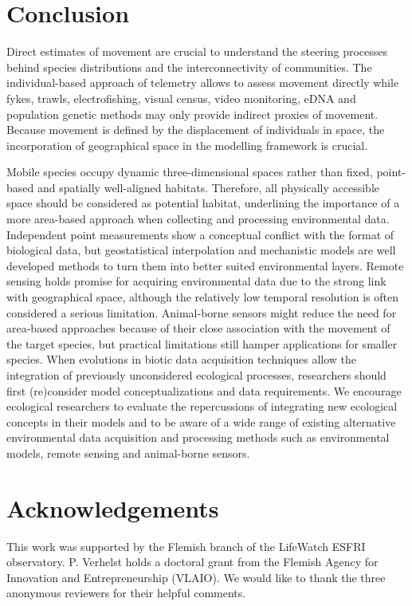 \documentclass[12pt,authoryear]{elsarticle}
\newcommand{\ackname}{Acknowledgements}
\begin{document}
\section{Conclusion}
Direct estimates of movement are crucial to understand the steering processes behind species distributions and the interconnectivity of communities. The individual-based approach of telemetry allows to assess movement directly while fykes, trawls, electrofishing, visual census, video monitoring, eDNA and population genetic methods may only provide indirect proxies of movement. Because movement is defined by the displacement of individuals in space, the incorporation of geographical space in the modelling framework is crucial. 

Mobile species occupy dynamic three-dimensional spaces rather than fixed, point-based and spatially well-aligned habitats. Therefore, all physically accessible space should be considered as potential habitat, underlining the importance of a more area-based approach when collecting and processing environmental data. Independent point measurements show a conceptual conflict with the format of biological data, but geostatistical interpolation and mechanistic models are well developed methods to turn them into better suited environmental layers. Remote sensing holds promise for acquiring environmental data due to the strong link with geographical space, although the relatively low temporal resolution is often considered a serious limitation. Animal-borne sensors might reduce the need for area-based approaches because of their close association with the movement of the target species, but practical limitations still hamper applications for smaller species. When evolutions in biotic data acquisition techniques allow the integration of previously unconsidered ecological processes, researchers should first (re)consider model conceptualizations and data requirements. We encourage ecological researchers to evaluate the repercussions of integrating new ecological concepts in their models and to be aware of a wide range of existing alternative environmental data acquisition and processing methods such as environmental models, remote sensing and animal-borne sensors.

\section*{\ackname}

This work was supported by the Flemish branch of the LifeWatch ESFRI observatory. P. Verhelst holds a doctoral grant from the Flemish Agency for Innovation and Entrepreneurship (VLAIO). We would like to thank the three anonymous reviewers for their helpful comments.
\end{document}
